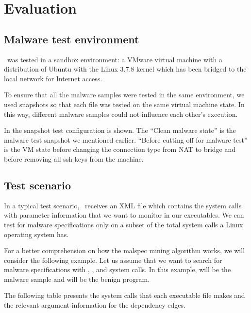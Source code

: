 \chapter{Evaluation}
\label{chapter:fifth}

\section{Malware test environment}
\label{fifth:test-env}

\project\ was tested in a sandbox environment: a VMware virtual machine with a distribution of Ubuntu with the Linux 3.7.8 kernel which has been bridged to the local network for Internet access.

To ensure that all the malware samples were tested in the same environment, we used snapshots so that each file was tested on the same virtual machine state. In this way, different malware samples could not influence each other's execution.


In  the snapshot test configuration is shown. The ``Clean malware state'' is the malware test snapshot we mentioned earlier. ``Before cutting off for malware test'' is the VM state before changing the connection type from NAT to bridge and before removing all ssh keys from the machine.


\section{Test scenario}
\label{fifth:test-scenario}

In a typical test scenario, \project\ receives an XML file which contains the system calls with parameter information that we want to monitor in our executables. We can test for malware specifications only on a subset of the total system calls a Linux operating system has.

For a better comprehension on how the malspec mining algorithm works, we will consider the following example. Let us assume that we want to search for malware specifications with , ,  and  system calls. In this example,  will be the malware sample and  will be the benign program.

The following table presents the system calls that each executable file makes and the relevant argument information for the dependency edges.

